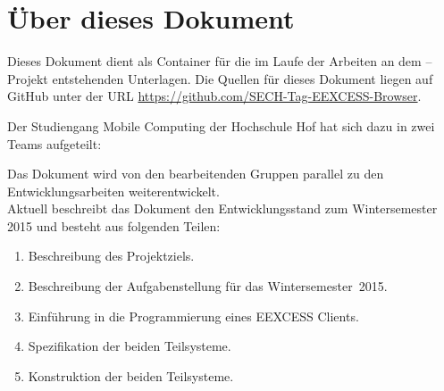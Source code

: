 \chapter*{Über dieses Dokument}

Dieses Dokument dient als Container für die im Laufe der
Arbeiten an dem \SECH--Projekt entstehenden Unterlagen. Die
Quellen für dieses Dokument liegen auf GitHub unter der URL
\url{https://github.com/SECH-Tag-EEXCESS-Browser}.

Der Studiengang Mobile Computing der Hochschule Hof hat sich dazu in zwei Teams aufgeteilt:




Das Dokument wird von den bearbeitenden Gruppen parallel zu den
Entwicklungsarbeiten weiterentwickelt. \\

Aktuell beschreibt das Dokument den Entwicklungsstand zum
Wintersemester 2015 und besteht aus folgenden Teilen:
\begin{enumerate}
     \item Beschreibung des Projektziels.
     \item Beschreibung der Aufgabenstellung für das Wintersemester~2015.
     \item Einführung in die Programmierung eines EEXCESS Clients.
     \item Spezifikation der beiden Teilsysteme.
     \item Konstruktion der beiden Teilsysteme.
\end{enumerate}

